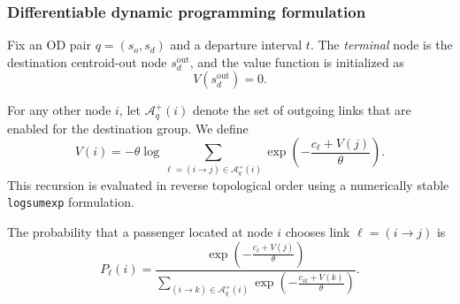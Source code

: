 \subsubsection{Differentiable dynamic programming formulation}

Fix an OD pair $q=(s_o,s_d)$ and a departure interval $t$. The \emph{terminal} node is the destination centroid-out node
$s_d^{\mathrm{out}}$, and the value function is initialized as
\[
V(s_d^{\mathrm{out}})=0.
\]

For any other node $i$, let $\mathcal{A}^+_q(i)$ denote the set of outgoing links that are enabled for the destination group.
We define
\[
V(i)
=
-\theta\log
\sum_{\ell=(i\to j)\in\mathcal{A}^+_q(i)}
\exp\!\left(-\frac{c_\ell + V(j)}{\theta}\right).
\]
This recursion is evaluated in reverse topological order using a numerically stable \texttt{logsumexp} formulation.

The probability that a passenger located at node $i$ chooses link $\ell=(i\to j)$ is
\[
P_\ell(i)
=
\frac{
\exp\!\left(-\frac{c_\ell + V(j)}{\theta}\right)
}{
  \sum_{(i\to k)\in\mathcal{A}^+_q(i)}
\exp\!\left(-\frac{c_{ik}+V(k)}{\theta}\right)
}.
\]

